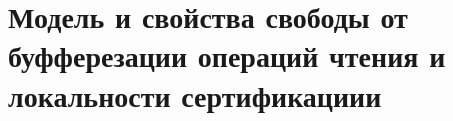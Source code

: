 \chapter{Модель \WkmS и свойства свободы от буфферезации операций чтения и локальности сертификациии}
\label{ch:weakestmo2}
